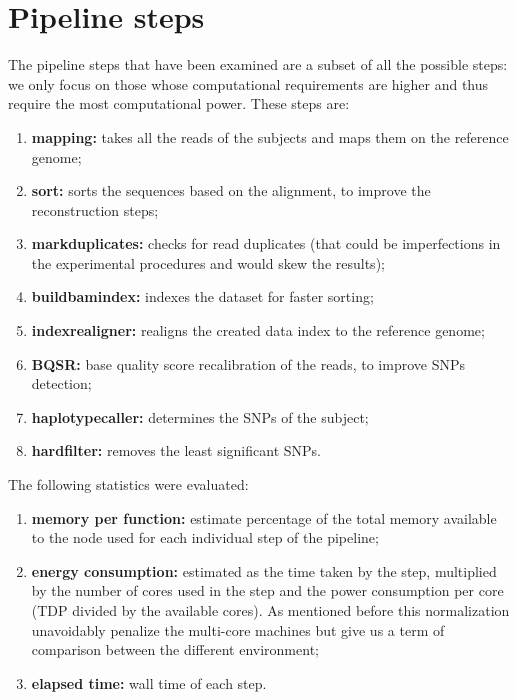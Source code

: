 \documentclass{standalone}
\begin{document}
\section*{Pipeline steps}

The pipeline steps that have been examined are a subset of all the possible steps: we only focus on those whose computational requirements are higher and thus require the most computational power.
These steps are:

\begin{enumerate}

\item\textbf{mapping:} takes all the reads of the subjects and maps them on the reference genome;

\item\textbf{sort:} sorts the sequences based on the alignment, to improve the reconstruction steps;

\item\textbf{markduplicates:} checks for read duplicates (that could be imperfections in the experimental procedures and would skew the results);

\item\textbf{buildbamindex:} indexes the dataset for faster sorting;

\item\textbf{indexrealigner:} realigns the created data index to the reference genome;

\item\textbf{BQSR:} base quality score recalibration of the reads, to improve SNPs detection;

\item\textbf{haplotypecaller:} determines the SNPs of the subject;

\item\textbf{hardfilter:} removes the least significant SNPs.

\end{enumerate}

The following statistics were evaluated:

\begin{enumerate}

\item\textbf{memory per function:} estimate percentage of the total memory available to the node used for each individual step of the pipeline;

\item\textbf{energy consumption:} estimated as the time taken by the step, multiplied by the number of cores used in the step and the power consumption per core (TDP divided by the available cores). As mentioned before this normalization unavoidably penalize the multi-core machines but give us a term of comparison between the different environment;

\item\textbf{elapsed time:} wall time of each step.

\end{enumerate}
\end{document}
